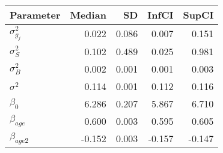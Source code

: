 \begin{table}[ht]
\centering
\begin{tabular}{lrrrr}
  \hline
Parameter & Median & SD & InfCI & SupCI \\ 
  \hline
$\sigma^{2}_{g_{j}}$ & 0.022 & 0.086 & 0.007 & 0.151 \\ 
  $\sigma^{2}_{S}$ & 0.102 & 0.489 & 0.025 & 0.981 \\ 
  $\sigma^{2}_{B}$ & 0.002 & 0.001 & 0.001 & 0.003 \\ 
  $\sigma^{2}$ & 0.114 & 0.001 & 0.112 & 0.116 \\ 
  $\beta_{0}$ & 6.286 & 0.207 & 5.867 & 6.710 \\ 
  $\beta_{age}$ & 0.600 & 0.003 & 0.595 & 0.605 \\ 
  $\beta_{age2}$ & -0.152 & 0.003 & -0.157 & -0.147 \\ 
   \hline
\end{tabular}
\end{table}
